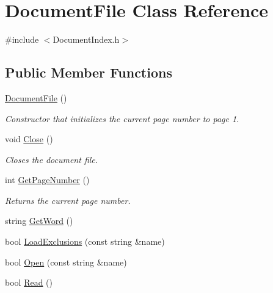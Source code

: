 \hypertarget{classDocumentFile}{}\section{Document\+File Class Reference}
\label{classDocumentFile}


{\ttfamily \#include $<$Document\+Index.\+h$>$}

\subsection*{Public Member Functions}
\begin{DoxyCompactItemize}
\item 
\hyperlink{classDocumentFile_a54643766baff0de19204e9bd9644c107}{Document\+File} ()\hypertarget{classDocumentFile_a54643766baff0de19204e9bd9644c107}{}\label{classDocumentFile_a54643766baff0de19204e9bd9644c107}

\begin{DoxyCompactList}\small\item\em Constructor that initializes the current page number to page 1. \end{DoxyCompactList}\item 
void \hyperlink{classDocumentFile_a887c2b3d7980a712701493210aa5b741}{Close} ()\hypertarget{classDocumentFile_a887c2b3d7980a712701493210aa5b741}{}\label{classDocumentFile_a887c2b3d7980a712701493210aa5b741}

\begin{DoxyCompactList}\small\item\em Closes the document file. \end{DoxyCompactList}\item 
int \hyperlink{classDocumentFile_a34aca2bfa5597c543a66b3851bdbf1af}{Get\+Page\+Number} ()\hypertarget{classDocumentFile_a34aca2bfa5597c543a66b3851bdbf1af}{}\label{classDocumentFile_a34aca2bfa5597c543a66b3851bdbf1af}

\begin{DoxyCompactList}\small\item\em Returns the current page number. \end{DoxyCompactList}\item 
string \hyperlink{classDocumentFile_aff23ce4d1e331cf29384c96d6d8d477a}{Get\+Word} ()
\item 
bool \hyperlink{classDocumentFile_a7c43b46a01a65dece7fe59b0688f8609}{Load\+Exclusions} (const string \&name)
\item 
bool \hyperlink{classDocumentFile_ab2d3560157bbd53d7987460aa4e4f5fb}{Open} (const string \&name)
\item 
bool \hyperlink{classDocumentFile_ab034b51535537e11de596c4d3374b093}{Read} ()
\end{DoxyCompactItemize}


